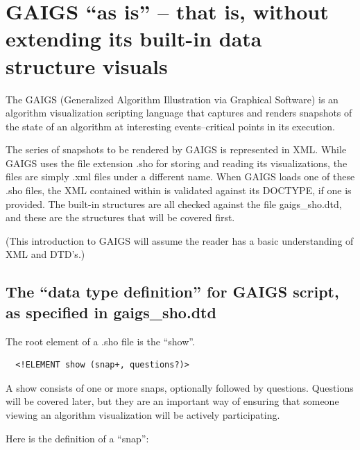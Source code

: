 \documentclass[12pt]{article}
\begin{document}
\section{GAIGS ``as is'' -- that is, without extending its built-in data structure visuals}

The GAIGS (Generalized Algorithm Illustration via Graphical Software)
is an algorithm visualization scripting language that captures and
renders snapshots of the state of an algorithm at interesting
events--critical points in its execution.



The series of snapshots to be rendered by GAIGS is represented in XML.
While GAIGS uses the file extension .sho for storing and reading its
visualizations, the files are simply .xml files under a different
name. When GAIGS loads one of these .sho files, the XML contained
within is validated against its DOCTYPE, if one is provided. The
built-in structures are all checked against the file gaigs\_sho.dtd,
and these are the structures that will be covered first.

(This introduction to GAIGS will assume the reader has a basic
understanding of XML and DTD's.)




\subsection{The ``data type definition'' for GAIGS script, as specified in gaigs\_sho.dtd}


The root element of a .sho file is the ``show''.

\footnotesize \begin{verbatim}
  <!ELEMENT show (snap+, questions?)>
\end{verbatim} \normalsize
  
A show consists of one or more snaps, optionally followed by
questions. Questions will be covered later, but they are an
important way of ensuring that someone viewing an algorithm
visualization will be actively participating.


Here is the definition of a ``snap'':
\end{document}
